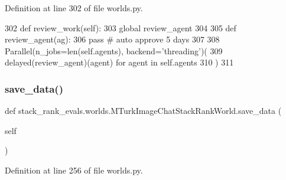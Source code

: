 Definition at line 302 of file worlds.\+py.


\begin{DoxyCode}
302     \textcolor{keyword}{def }review\_work(self):
303         \textcolor{keyword}{global} review\_agent
304 
305         \textcolor{keyword}{def }review\_agent(ag):
306             \textcolor{keywordflow}{pass}  \textcolor{comment}{# auto approve 5 days}
307 
308         Parallel(n\_jobs=len(self.agents), backend=\textcolor{stringliteral}{'threading'})(
309             delayed(review\_agent)(agent) \textcolor{keywordflow}{for} agent \textcolor{keywordflow}{in} self.agents
310         )
311 
\end{DoxyCode}
\mbox{\label{classstack__rank__evals_1_1worlds_1_1MTurkImageChatStackRankWorld_a54a526f54b82c3de45d3d2edad9a6658}} 
\subsubsection{\texorpdfstring{save\+\_\+data()}{save\_data()}}
{\footnotesize\ttfamily def stack\+\_\+rank\+\_\+evals.\+worlds.\+M\+Turk\+Image\+Chat\+Stack\+Rank\+World.\+save\+\_\+data (\begin{DoxyParamCaption}\item[{}]{self }\end{DoxyParamCaption})}



Definition at line 256 of file worlds.\+py.



